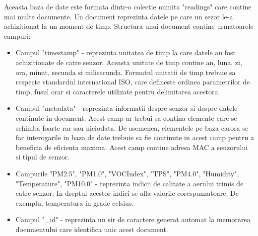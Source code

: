 Aceasta baza de date este formata dintr-o colectie numita "readings" care contine mai multe documente. Un document reprezinta datele pe care un sezor le-a achizitionat 
la un moment de timp. Structura unui document contine urmatoarele campuri:
\begin{itemize}
	\item Campul "timestamp" - reprezinta unitatea de timp la care datele au fost achizitionate de catre senzor. Aceasta unitate de timp contine an, luna, zi, ora, 
	minut, secunda si milisecunda. Formatul unitatii de timp trebuie sa respecte standardul international ISO, care defineste ordinea parametrilor de timp, 
    fusul orar si caracterele utilizate pentru delimitarea acestora.
	\item Campul "metadata" - reprezinta informatii despre senzor si despre datele continute in document. Acest camp ar trebui sa contina elemente care se schimba 
	foarte rar sau niciodata. De asemenea, elementele pe baza carora se fac interogarile in baza de date trebuie sa fie continute in acest camp pentru a beneficia 
    de eficienta maxima. Acest camp contine adresa MAC a senzorului si tipul de senzor. 
	\item Campurile "PM2.5", "PM1.0", "VOCIndex", "TPS", "PM4.0", "Humidity", "Temperature", "PM10.0" - reprezinta indicii de calitate a aerului trimis de catre senzor.  
    In dreptul acestor indici se afla valorile corespunzatoare. De exemplu, temperatura in grade celsius.
	\item Campul "\_id" - reprezinta un sir de caractere generat automat la memorarea documentului care identifica unic acest document.
\end{itemize}

